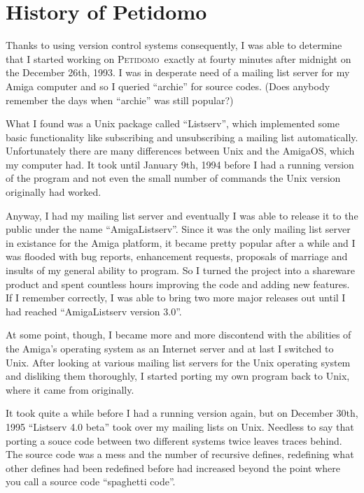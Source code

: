 \documentclass[a4paper]{report}
\newcommand{\Petidomo}{{\scshape Peti\-domo}}
\begin{document}
\section{History of Petidomo}

Thanks to using version control systems consequently, I was able to
determine that I started working on \Petidomo\ exactly at fourty
minutes after midnight on the December 26th, 1993. I was in desperate
need of a mailing list server for my Amiga computer and so I queried
``archie'' for source codes. (Does anybody remember the days when
``archie'' was still popular?)

What I found was a Unix package called ``Listserv'', which implemented
some basic functionality like subscribing and unsubscribing a mailing
list automatically. Unfortunately there are many differences between
Unix and the AmigaOS, which my computer had. It took until January
9th, 1994 before I had a running version of the program and not even
the small number of commands the Unix version originally had worked.

Anyway, I had my mailing list server and eventually I was able to
release it to the public under the name ``AmigaListserv''. Since it
was the only mailing list server in existance for the Amiga platform,
it became pretty popular after a while and I was flooded with bug
reports, enhancement requests, proposals of marriage and insults of my
general ability to program. So I turned the project into a shareware
product and spent countless hours improving the code and adding new
features. If I remember correctly, I was able to bring two more major
releases out until I had reached ``AmigaListserv version 3.0''.

At some point, though, I became more and more discontend with the
abilities of the Amiga's operating system as an Internet server and at
last I switched to Unix. After looking at various mailing list servers
for the Unix operating system and disliking them thoroughly, I started
porting my own program back to Unix, where it came from originally.

It took quite a while before I had a running version again, but on
December 30th, 1995 ``Listserv 4.0 beta'' took over my mailing lists on
Unix. Needless to say that porting a souce code between two different
systems twice leaves traces behind. The source code was a mess and the
number of recursive defines, redefining what other defines had been
redefined before had increased beyond the point where you call a
source code ``spaghetti code''.
\end{document}

